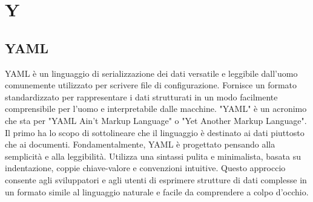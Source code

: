 \section{Y}

\vspace{2em}
\subsection*{YAML}
YAML è un linguaggio di serializzazione dei dati versatile e leggibile dall'uomo comunemente utilizzato per scrivere file di configurazione.
Fornisce un formato standardizzato per rappresentare i dati strutturati in un modo facilmente comprensibile per l'uomo e interpretabile dalle macchine. "YAML" è un acronimo che sta per "YAML Ain't Markup Language" o "Yet Another Markup Language". Il primo ha lo scopo di sottolineare che il linguaggio è destinato ai dati piuttosto che ai documenti.
Fondamentalmente, YAML è progettato pensando alla semplicità e alla leggibilità. Utilizza una sintassi pulita e minimalista, basata su indentazione, coppie chiave-valore e convenzioni intuitive. Questo approccio consente agli sviluppatori e agli utenti di esprimere strutture di dati complesse in un formato simile al linguaggio naturale e facile da comprendere a colpo d'occhio.
